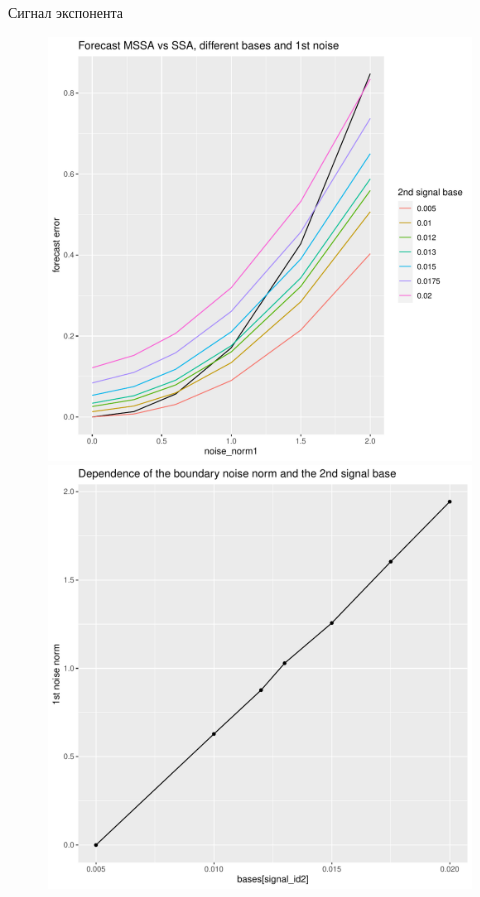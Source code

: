 \documentclass[ucs, notheorems, handout]{beamer}
\newcommand{\SSA}{\mathsf{SSA}}
\newcommand{\MSSA}{\mathsf{MSSA}}
\begin{document}
\begin{frame}{Сигнал экспонента}
    \begin{figure}[h]
        \centering
        \begin{minipage}{.5\textwidth}
            \centering
            \includegraphics[width=\textwidth]{experiment_2_exp1.pdf}
        \end{minipage}%
        \begin{minipage}{.5\textwidth}
            \centering
        \includegraphics[width=\textwidth]{experiment_2_exp2.pdf}
        \end{minipage}
    \end{figure}


\end{frame}
\end{document}
